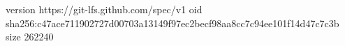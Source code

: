 version https://git-lfs.github.com/spec/v1
oid sha256:c47ace711902727d00703a13149f97ec2becf98aa8cc7c94ee101f14d47c7c3b
size 262240
